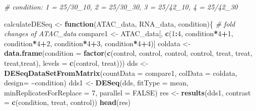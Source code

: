 \documentclass[
]{article}
\newenvironment{Shaded}{\begin{snugshade}}{\end{snugshade}}
\newcommand{\AttributeTok}[1]{\textcolor[rgb]{0.13,0.29,0.53}{#1}}
\newcommand{\CommentTok}[1]{\textcolor[rgb]{0.56,0.35,0.01}{\textit{#1}}}
\newcommand{\ConstantTok}[1]{\textcolor[rgb]{0.56,0.35,0.01}{#1}}
\newcommand{\ControlFlowTok}[1]{\textcolor[rgb]{0.13,0.29,0.53}{\textbf{#1}}}
\newcommand{\DecValTok}[1]{\textcolor[rgb]{0.00,0.00,0.81}{#1}}
\newcommand{\FunctionTok}[1]{\textcolor[rgb]{0.13,0.29,0.53}{\textbf{#1}}}
\newcommand{\NormalTok}[1]{#1}
\newcommand{\OtherTok}[1]{\textcolor[rgb]{0.56,0.35,0.01}{#1}}
\newcommand{\SpecialCharTok}[1]{\textcolor[rgb]{0.81,0.36,0.00}{\textbf{#1}}}
\newcommand{\StringTok}[1]{\textcolor[rgb]{0.31,0.60,0.02}{#1}}
\begin{document}
\begin{Shaded}
\begin{Highlighting}[]
\CommentTok{\# condition: 1 = 25/30\_10, 2 = 25/30\_30, 3 = 25/42\_10, 4 = 25/42\_30}

\NormalTok{calculateDESeq }\OtherTok{\textless{}{-}} \ControlFlowTok{function}\NormalTok{(ATAC\_data, RNA\_data, condition)\{}
  \CommentTok{\# fold changes of ATAC\_data}
\NormalTok{  compare1 }\OtherTok{\textless{}{-}}\NormalTok{ ATAC\_data[, }\FunctionTok{c}\NormalTok{(}\DecValTok{1}\SpecialCharTok{:}\DecValTok{4}\NormalTok{, condition}\SpecialCharTok{*}\DecValTok{4}\SpecialCharTok{+}\DecValTok{1}\NormalTok{, condition}\SpecialCharTok{*}\DecValTok{4}\SpecialCharTok{+}\DecValTok{2}\NormalTok{, condition}\SpecialCharTok{*}\DecValTok{4}\SpecialCharTok{+}\DecValTok{3}\NormalTok{, condition}\SpecialCharTok{*}\DecValTok{4}\SpecialCharTok{+}\DecValTok{4}\NormalTok{)]}
\NormalTok{  coldata }\OtherTok{\textless{}{-}} \FunctionTok{data.frame}\NormalTok{(}\AttributeTok{condition =} \FunctionTok{factor}\NormalTok{(}\FunctionTok{c}\NormalTok{(}\StringTok{\textquotesingle{}control\textquotesingle{}}\NormalTok{, }\StringTok{\textquotesingle{}control\textquotesingle{}}\NormalTok{, }\StringTok{\textquotesingle{}control\textquotesingle{}}\NormalTok{, }\StringTok{\textquotesingle{}control\textquotesingle{}}\NormalTok{, }\StringTok{\textquotesingle{}treat\textquotesingle{}}\NormalTok{, }\StringTok{\textquotesingle{}treat\textquotesingle{}}\NormalTok{, }\StringTok{\textquotesingle{}treat\textquotesingle{}}\NormalTok{,}\StringTok{\textquotesingle{}treat\textquotesingle{}}\NormalTok{), }\AttributeTok{levels =} \FunctionTok{c}\NormalTok{(}\StringTok{\textquotesingle{}control\textquotesingle{}}\NormalTok{, }\StringTok{\textquotesingle{}treat\textquotesingle{}}\NormalTok{)))}
\NormalTok{  dds }\OtherTok{\textless{}{-}} \FunctionTok{DESeqDataSetFromMatrix}\NormalTok{(}\AttributeTok{countData =}\NormalTok{ compare1, }\AttributeTok{colData =}\NormalTok{ coldata, }\AttributeTok{design=} \SpecialCharTok{\textasciitilde{}}\NormalTok{condition)}
\NormalTok{  dds1 }\OtherTok{\textless{}{-}} \FunctionTok{DESeq}\NormalTok{(dds, }\AttributeTok{fitType =} \StringTok{\textquotesingle{}mean\textquotesingle{}}\NormalTok{, }\AttributeTok{minReplicatesForReplace =} \DecValTok{7}\NormalTok{, }\AttributeTok{parallel =} \ConstantTok{FALSE}\NormalTok{)}
\NormalTok{  res }\OtherTok{\textless{}{-}} \FunctionTok{results}\NormalTok{(dds1, }\AttributeTok{contrast =} \FunctionTok{c}\NormalTok{(}\StringTok{\textquotesingle{}condition\textquotesingle{}}\NormalTok{, }\StringTok{\textquotesingle{}treat\textquotesingle{}}\NormalTok{, }\StringTok{\textquotesingle{}control\textquotesingle{}}\NormalTok{))}
  \FunctionTok{head}\NormalTok{(res)}


\end{Highlighting}
\end{Shaded}
\end{document}
